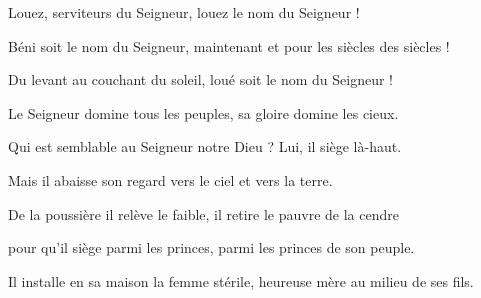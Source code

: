 \item Louez, serviteurs du Seigneur, louez le nom du Seigneur !

\item Béni soit le nom du Seigneur, maintenant et pour les siècles des siècles !

\item Du levant au couchant du soleil, loué soit le nom du Seigneur !

\item Le Seigneur domine tous les peuples, sa gloire domine les cieux.

\item Qui est semblable au Seigneur notre Dieu ? Lui, il siège là-haut.

\item Mais il abaisse son regard vers le ciel et vers la terre.

\item De la poussière il relève le faible, il retire le pauvre de la cendre

\item pour qu'il siège parmi les princes, parmi les princes de son peuple.

\item Il installe en sa maison la femme stérile, heureuse mère au milieu de ses fils.
